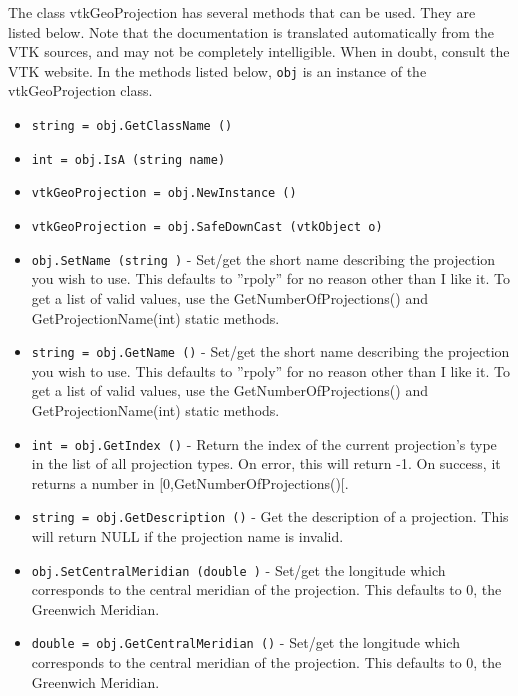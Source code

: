 The class vtkGeoProjection has several methods that can be used.
  They are listed below.
Note that the documentation is translated automatically from the VTK sources,
and may not be completely intelligible.  When in doubt, consult the VTK website.
In the methods listed below, \verb|obj| is an instance of the vtkGeoProjection class.
\begin{itemize}
\item  \verb|string = obj.GetClassName ()|

\item  \verb|int = obj.IsA (string name)|

\item  \verb|vtkGeoProjection = obj.NewInstance ()|

\item  \verb|vtkGeoProjection = obj.SafeDownCast (vtkObject o)|

\item  \verb|obj.SetName (string )| -  Set/get the short name describing the projection you wish to use.
 This defaults to ''rpoly'' for no reason other than I like it.
 To get a list of valid values, use the GetNumberOfProjections() and
 GetProjectionName(int) static methods.

\item  \verb|string = obj.GetName ()| -  Set/get the short name describing the projection you wish to use.
 This defaults to ''rpoly'' for no reason other than I like it.
 To get a list of valid values, use the GetNumberOfProjections() and
 GetProjectionName(int) static methods.

\item  \verb|int = obj.GetIndex ()| -  Return the index of the current projection's type in the list of all projection types.
 On error, this will return -1. On success, it returns a number in [0,GetNumberOfProjections()[.

\item  \verb|string = obj.GetDescription ()| -  Get the description of a projection.
 This will return NULL if the projection name is invalid.

\item  \verb|obj.SetCentralMeridian (double )| -  Set/get the longitude which corresponds to the central meridian of the projection.
 This defaults to 0, the Greenwich Meridian.

\item  \verb|double = obj.GetCentralMeridian ()| -  Set/get the longitude which corresponds to the central meridian of the projection.
 This defaults to 0, the Greenwich Meridian.

\end{itemize}
